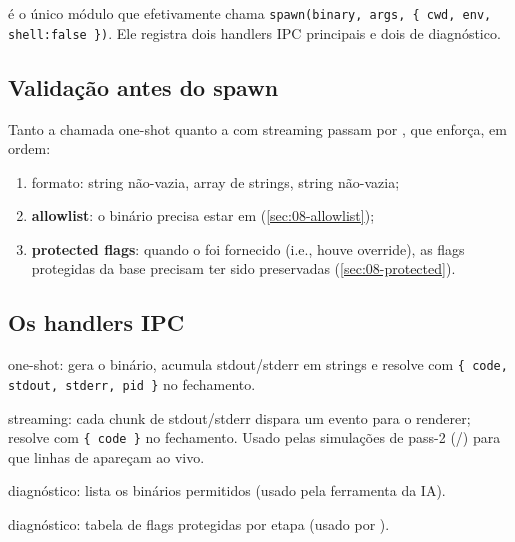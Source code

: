  é o único módulo que efetivamente chama
\lstinline|spawn(binary, args, { cwd, env, shell:false })|. Ele registra dois
handlers IPC principais e dois de diagnóstico.

\subsection{Validação antes do spawn}

Tanto a chamada one-shot quanto a com streaming passam por
, que enforça, em ordem:

\begin{enumerate}[leftmargin=1.6em]
  \item formato:  string não-vazia,  array de
    strings,  string não-vazia;
  \item \textbf{allowlist}: o binário precisa estar em 
    (\autoref{sec:08-allowlist});
  \item \textbf{protected flags}: quando o  foi fornecido (i.e.,
    houve override), as flags protegidas da base precisam ter sido preservadas
    (\autoref{sec:08-protected}).
\end{enumerate}

\subsection{Os handlers IPC}

\begin{description}[leftmargin=1.4em]
  \item[\code{exec-spec}] one-shot: gera o binário, acumula stdout/stderr em
    strings e resolve com \lstinline|{ code, stdout, stderr, pid }| no
    fechamento.
  \item[\code{exec-spec-streamed}] streaming: cada chunk de stdout/stderr dispara
    um evento  para o renderer; resolve com
    \lstinline|{ code }| no fechamento. Usado pelas simulações de pass-2
    (/) para que linhas de  apareçam ao
    vivo.
  \item[\code{exec-spec-allowed-binaries}] diagnóstico: lista os binários
    permitidos (usado pela ferramenta  da IA).
  \item[\code{exec-spec-protected-flags}] diagnóstico: tabela de flags protegidas
    por etapa (usado por ).
\end{description}

